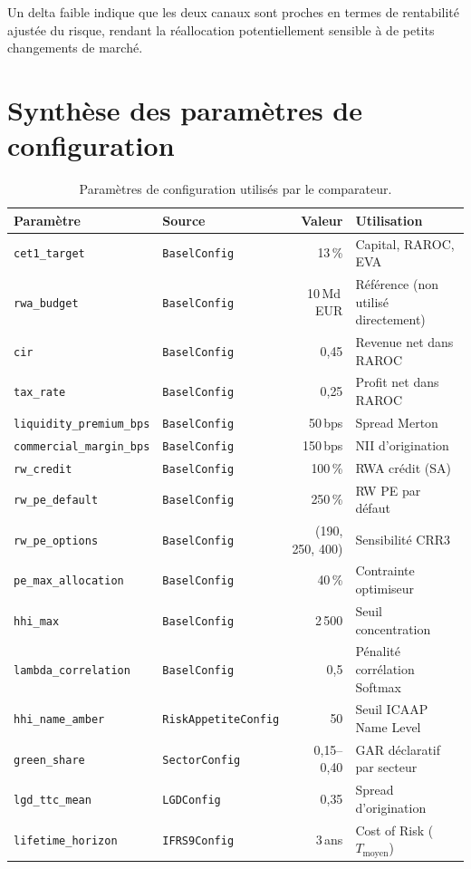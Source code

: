 \documentclass[12pt,a4paper]{article}
\begin{document}
Un delta faible indique que les deux canaux sont proches en termes de rentabilit\'e ajust\'ee du risque, rendant la r\'eallocation potentiellement sensible \`a de petits changements de march\'e.

\section{Synth\`ese des param\`etres de configuration}
\label{sec:config_summary}

\begin{table}[h]
\centering
\begin{tabular}{llrl}
\toprule
\textbf{Param\`etre} & \textbf{Source} & \textbf{Valeur} & \textbf{Utilisation} \\
\midrule
\texttt{cet1\_target} & \texttt{BaselConfig} & 13\,\% & Capital, RAROC, EVA \\
\texttt{rwa\_budget} & \texttt{BaselConfig} & 10\,Md\,EUR & R\'ef\'erence (non utilis\'e directement) \\
\texttt{cir} & \texttt{BaselConfig} & 0{,}45 & Revenue net dans RAROC \\
\texttt{tax\_rate} & \texttt{BaselConfig} & 0{,}25 & Profit net dans RAROC \\
\texttt{liquidity\_premium\_bps} & \texttt{BaselConfig} & 50\,bps & Spread Merton \\
\texttt{commercial\_margin\_bps} & \texttt{BaselConfig} & 150\,bps & NII d'origination \\
\texttt{rw\_credit} & \texttt{BaselConfig} & 100\,\% & RWA cr\'edit (SA) \\
\texttt{rw\_pe\_default} & \texttt{BaselConfig} & 250\,\% & RW PE par d\'efaut \\
\texttt{rw\_pe\_options} & \texttt{BaselConfig} & (190, 250, 400) & Sensibilit\'e CRR3 \\
\texttt{pe\_max\_allocation} & \texttt{BaselConfig} & 40\,\% & Contrainte optimiseur \\
\texttt{hhi\_max} & \texttt{BaselConfig} & 2\,500 & Seuil concentration \\
\texttt{lambda\_correlation} & \texttt{BaselConfig} & 0{,}5 & P\'enalit\'e corr\'elation Softmax \\
\texttt{hhi\_name\_amber} & \texttt{RiskAppetiteConfig} & 50 & Seuil ICAAP Name Level \\
\texttt{green\_share} & \texttt{SectorConfig} & 0{,}15--0{,}40 & GAR d\'eclaratif par secteur \\
\texttt{lgd\_ttc\_mean} & \texttt{LGDConfig} & 0{,}35 & Spread d'origination \\
\texttt{lifetime\_horizon} & \texttt{IFRS9Config} & 3\,ans & Cost of Risk ($T_{\text{moyen}}$) \\
\bottomrule
\end{tabular}
\caption{Param\`etres de configuration utilis\'es par le comparateur.}
\label{tab:config_params}
\end{table}
\end{document}
